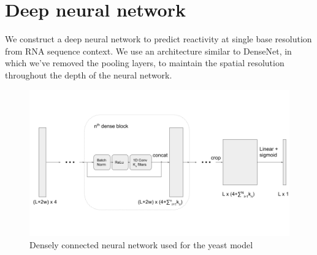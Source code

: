 \documentclass{proposal}
\begin{document}




\section{Deep neural network}


We construct a deep neural network to predict reactivity at single base resolution from RNA sequence context.
We use an architecture similar to DenseNet\cite{huang2017densely},
in which we've removed the pooling layers, to maintain the spatial resolution throughout the depth of the neural network.

%  

\begin{figure}
\includegraphics[width=\textwidth]{proposal_dense_net.png}
\caption{Densely connected neural network used for the yeast model}
\label{fig:dense_net}
\centering
\end{figure}
\end{document}
